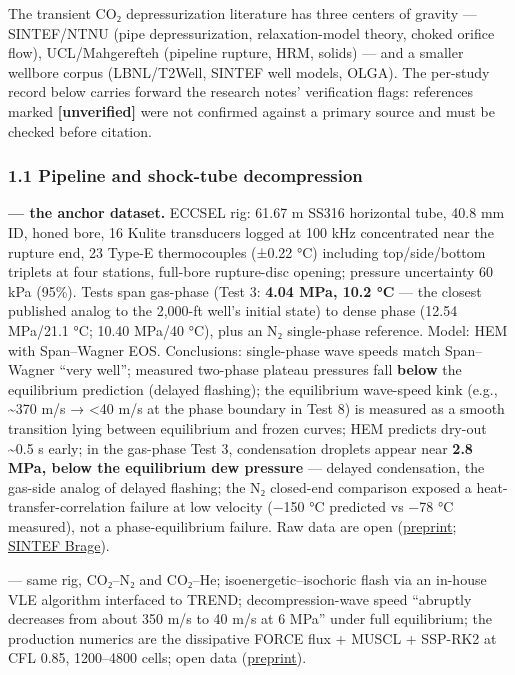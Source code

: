 The transient CO₂ depressurization literature has three centers of
gravity --- SINTEF/NTNU (pipe depressurization, relaxation-model theory,
choked orifice flow), UCL/Mahgerefteh (pipeline rupture, HRM, solids)
--- and a smaller wellbore corpus (LBNL/T2Well, SINTEF well models,
OLGA). The per-study record below carries forward the research notes'
verification flags: references marked \textbf{{[}unverified{]}} were not
confirmed against a primary source and must be checked before citation.

\hypertarget{pipeline-and-shock-tube-decompression}{%
\subsubsection{1.1 Pipeline and shock-tube
decompression}\label{pipeline-and-shock-tube-decompression}}

\textbf{\citet{munkejord2020} --- the anchor dataset.} ECCSEL rig: 61.67 m
SS316 horizontal tube, 40.8 mm ID, honed bore, 16 Kulite transducers
logged at 100 kHz concentrated near the rupture end, 23 Type-E
thermocouples (±0.22 °C) including top/side/bottom triplets at four
stations, full-bore rupture-disc opening; pressure uncertainty 60 kPa
(95\%). Tests span gas-phase (Test 3: \textbf{4.04 MPa, 10.2 °C} --- the
closest published analog to the 2,000-ft well's initial state) to dense
phase (12.54 MPa/21.1 °C; 10.40 MPa/40 °C), plus an N₂ single-phase
reference. Model: HEM with Span--Wagner EOS. Conclusions: single-phase
wave speeds match Span--Wagner ``very well''; measured two-phase plateau
pressures fall \textbf{below} the equilibrium prediction (delayed
flashing); the equilibrium wave-speed kink (e.g., \textasciitilde370 m/s
→ \textless40 m/s at the phase boundary in Test 8) is measured as a
smooth transition lying between equilibrium and frozen curves; HEM
predicts dry-out \textasciitilde0.5 s early; in the gas-phase Test 3,
condensation droplets appear near \textbf{2.8 MPa, below the equilibrium
dew pressure} --- delayed condensation, the gas-side analog of delayed
flashing; the N₂ closed-end comparison exposed a
heat-transfer-correlation failure at low velocity (−150 °C predicted vs
−78 °C measured), not a phase-equilibrium failure. Raw data are open \citep{sintef2020data} (\href{https://www.pvv.ntnu.no/~stm/dring/depress-co2-exp.pdf}{preprint};
\href{https://sintef.brage.unit.no/sintef-xmlui/handle/11250/2770324}{SINTEF
Brage}).

\textbf{\citet{munkejord2021}} --- same rig, CO₂--N₂ and CO₂--He;
isoenergetic--isochoric flash via an in-house VLE algorithm interfaced
to TREND; decompression-wave speed ``abruptly decreases from about 350
m/s to 40 m/s at 6 MPa'' under full equilibrium; the production numerics
are the dissipative FORCE flux + MUSCL + SSP-RK2 at CFL 0.85, 1200--4800
cells; open data \citep{sintef2021data} (\href{https://www.pvv.ntnu.no/~stm/dring/depress-mix-exp.pdf}{preprint}).

